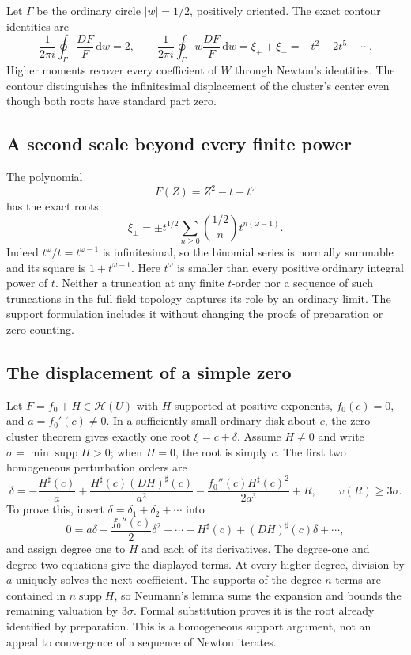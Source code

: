 \documentclass[11pt,letterpaper]{article}
\numberwithin{equation}{section}
\theoremstyle{definition}
\theoremstyle{remark}
\newcommand{\HH}{\mathscr H}
\newcommand{\dd}{\,\mathrm d}
\DeclareMathOperator{\supp}{supp}
\begin{document}
Let $\Gamma$ be the ordinary circle $|w|=1/2$, positively oriented.
The exact contour identities are
\[
 \frac1{2\pi i}\oint_\Gamma\frac{DF}{F}\dd w=2,
 \qquad
 \frac1{2\pi i}\oint_\Gamma w\frac{DF}{F}\dd w
 =\xi_++\xi_-=-t^2-2t^5-\cdots.
\]
Higher moments recover every coefficient of $W$ through Newton's
identities. The contour distinguishes the infinitesimal displacement
of the cluster's center even though both roots have standard part zero.

\subsection{A second scale beyond every finite power}

The polynomial
\[
 F(Z)=Z^2-t-t^\omega
\]
has the exact roots
\begin{equation}\label{eq:twoscale}
 \xi_\pm=\pm t^{1/2}
 \sum_{n\ge0}\binom{1/2}{n}t^{n(\omega-1)}.
\end{equation}
Indeed $t^\omega/t=t^{\omega-1}$ is infinitesimal, so the binomial
series is normally summable and its square is $1+t^{\omega-1}$.
Here $t^\omega$ is smaller than every positive ordinary integral power
of $t$. Neither a truncation at any finite $t$-order nor a sequence of
such truncations in the full field topology captures its role by an
ordinary limit. The support formulation includes it without changing
the proofs of preparation or zero counting.

\subsection{The displacement of a simple zero}

Let $F=f_0+H\in\HH(U)$ with $H$ supported at positive exponents,
$f_0(c)=0$, and $a=f_0'(c)\ne0$. In a sufficiently small ordinary disk
about $c$, the zero-cluster theorem gives exactly one root $\xi=c+\delta$.
Assume $H\ne0$ and write $\sigma=\min\supp H>0$; when $H=0$, the
root is simply $c$. The first two homogeneous perturbation orders are
\begin{equation}\label{eq:zerodisplacement}
 \delta=-\frac{H^\sharp(c)}a
 +\frac{H^\sharp(c)(DH)^\sharp(c)}{a^2}
 -\frac{f_0''(c)H^\sharp(c)^2}{2a^3}+R,
 \qquad v(R)\ge3\sigma.
\end{equation}
To prove this, insert $\delta=\delta_1+\delta_2+\cdots$ into
\[
 0=a\delta+\frac{f_0''(c)}2\delta^2+\cdots
       +H^\sharp(c)+(DH)^\sharp(c)\delta+\cdots,
\]
and assign degree one to $H$ and each of its derivatives. The degree-one
and degree-two equations give the displayed terms. At every higher
degree, division by $a$ uniquely solves the next coefficient. The
supports of the degree-$n$ terms are contained in $n\supp H$, so
Neumann's lemma sums the expansion and bounds the remaining valuation
by $3\sigma$. Formal substitution proves it is the root already
identified by preparation. This is a homogeneous support argument,
not an appeal to convergence of a sequence of Newton iterates.
\end{document}

